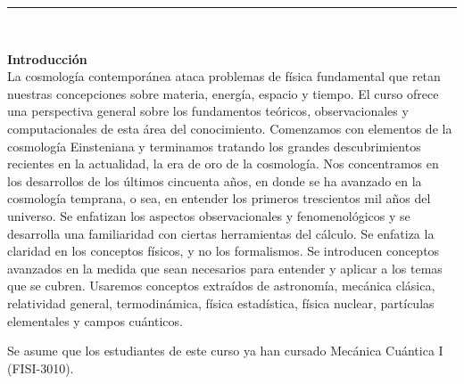 \documentclass[letterpaper,10pt,onecolumn]{article}
\begin{document}




\noindent\rule{\textwidth}{1pt}\\[-0.1cm]

\addtocounter{mysection}{1}

\noindent\textbf{\large {} \quad Introducci\'on}\\[-0.2cm]


\noindent\normalsize 
La cosmología contemporánea ataca problemas de física fundamental que
retan nuestras concepciones sobre materia, energía, espacio y
tiempo. 
El curso ofrece una perspectiva general sobre los fundamentos
teóricos, observacionales y computacionales de esta área del
conocimiento. 
Comenzamos con elementos de la  cosmología Einsteniana y
terminamos tratando los grandes descubrimientos  recientes en la
actualidad,  la era de oro de la cosmología. Nos concentramos  en los
desarrollos de los últimos cincuenta años, en donde se ha avanzado en
la cosmología temprana, o sea, en entender los primeros trescientos
mil años  del universo. Se enfatizan los aspectos observacionales y
fenomenológicos y  se desarrolla una familiaridad con ciertas
herramientas del cálculo. Se  enfatiza la claridad en los conceptos
físicos, y no los formalismos. Se  introducen conceptos avanzados en
la medida que sean necesarios para  entender y aplicar a los temas que
se cubren. Usaremos conceptos extraídos  de astronomía, mecánica
clásica, relatividad general, termodinámica, física  estadística,
física nuclear, partículas elementales y campos cuánticos.  


Se asume que los estudiantes de este curso ya han cursado Mec\'anica
Cu\'antica I (FISI-3010).
\\[0.1cm]
\end{document}

